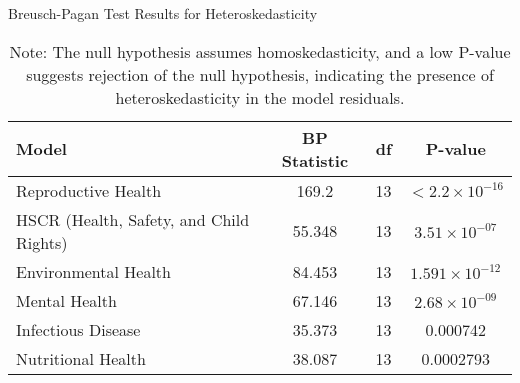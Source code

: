 \begin{table}[H]
    \centering
    \caption{Breusch-Pagan Test Results for Heteroskedasticity}
    \begin{tabular}{lccc}
        \toprule
        \textbf{Model} & \textbf{BP Statistic} & \textbf{df} & \textbf{P-value} \\
        \midrule
        Reproductive Health & 169.2 & 13 & $< 2.2 \times 10^{-16}$ \\
        HSCR (Health, Safety, and Child Rights) & 55.348 & 13 & $3.51 \times 10^{-07}$ \\
        Environmental Health & 84.453 & 13 & $1.591 \times 10^{-12}$ \\
        Mental Health & 67.146 & 13 & $2.68 \times 10^{-09}$ \\
        Infectious Disease & 35.373 & 13 & 0.000742 \\
        Nutritional Health & 38.087 & 13 & 0.0002793 \\
        \bottomrule
    \end{tabular}
    \vspace{0.5em} %
    \caption*{Note: The null hypothesis assumes homoskedasticity, and a low P-value suggests rejection of the null hypothesis, indicating the presence of heteroskedasticity in the model residuals.}
    \label{Tab::Heteroskedict}
\end{table}
